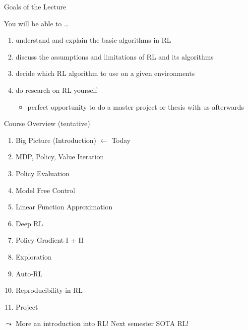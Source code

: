\documentclass[aspectratio=169, handout]{../latex_main/tntbeamer}  %
\begin{document}
\begin{frame}[c]{Goals of the Lecture}
	
	You will be able to \ldots
	\begin{enumerate}
		\item \alert{understand} and \alert{explain} the basic algorithms in RL
		\smallskip
		\item \alert{discuss} the assumptions and limitations of RL and its algorithms
		\smallskip
		\item  \alert{decide} which RL algorithm to use on a given environments
		\smallskip
		\item \alert{do} research on RL yourself
		\begin{itemize}
			\item perfect opportunity to do a master project or thesis with us afterwards
		\end{itemize}
	\end{enumerate}
	
\end{frame}
\begin{frame}[c]{Course Overview (tentative)}
	
	\begin{enumerate}
		\item Big Picture (Introduction) $\xleftarrow{}$ Today
		\item MDP, Policy, Value Iteration
		\item Policy Evaluation
		\item Model Free Control
		\item Linear Function Approximation
		\item Deep RL
		\item Policy Gradient I + II
		\item Exploration
            \item Auto-RL		
            \item Reproducibility in RL
		\item Project
	\end{enumerate}
	
	\pause
	$\leadsto$ \alert{More an introduction into RL! Next semester SOTA RL!}
	
\end{frame}
\end{document}
